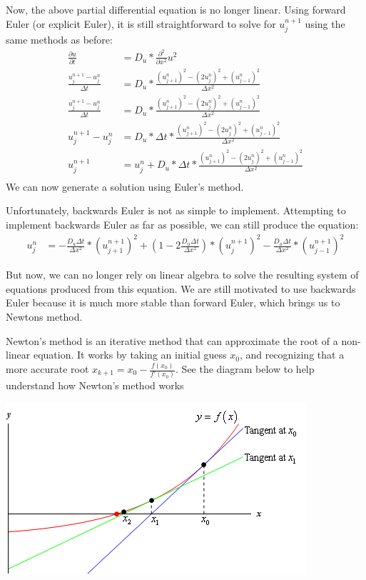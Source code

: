 \documentclass[11pt]{article}
\begin{document}
Now, the above partial differential equation is no longer linear. Using forward Euler (or explicit Euler), it is still straightforward to solve for $u^{n+1}_{j}$ using the same methods as before:
\begin{align*}
    \frac{\partial u}{\partial t} &= D_u * \frac{\partial^{2}}{\partial x^{2}}u^2\\
    \frac{u^{n+1}_{j}-u^{n}_{j}}{\Delta t}&= D_u * \frac{(u^{n}_{j+1})^2-(2u^{n}_{j})^2+(u^{n}_{j-1})^2}{\Delta x^2}\\
    \frac{u^{n+1}_{j}-u^{n}_{j}}{\Delta t} &= D_u * \frac{(u^{n}_{j+1})^2-(2u^{n}_{j})^2+(u^{n}_{j-1})^2}{\Delta x^2}\\
    u^{n+1}_{j} - u^{n}_{j}&= D_u *\Delta t*    \frac{(u^{n}_{j+1})^2-(2u^{n}_{j})^2+(u^{n}_{j-1})^2}{\Delta x^2}\\
    u^{n+1}_{j} &= u^{n}_{j} + D_u *\Delta t*    \frac{(u^{n}_{j+1})^2-(2u^{n}_{j})^2+(u^{n}_{j-1})^2}{\Delta x^2}\\
\end{align*}
We can now generate a solution using Euler's method.

Unfortunately, backwards Euler is not as simple to implement. Attempting to implement backwards Euler as far as possible, we can still produce the equation:
\begin{align*}
    u^{n}_{j} &= -\frac{D_u\Delta t}{\Delta x^2}*(u^{n+1}_{j+1})^2 + (1-2\frac{D_u\Delta t}{\Delta x^2})*(u^{n+1}_{j})^2 - \frac{D_u\Delta t}{\Delta x^2}*(u^{n+1}_{j-1})^2
\end{align*}

But now, we can no longer rely on linear algebra to solve the resulting system of equations produced from this equation. We are still motivated to use backwards Euler because it is much more stable than forward Euler, which brings us to Newtons method.

Newton's method is an iterative method that can approximate the root of a non-linear equation. It works by taking an initial guess $x_0$, and recognizing that a more accurate root $x_{k+1} = x_0 - \frac{f(x_0)}{f'(x_0)}$. See the diagram below to help understand how Newton's method works

\includegraphics{NewtonsMethodImage.png}
\end{document}
